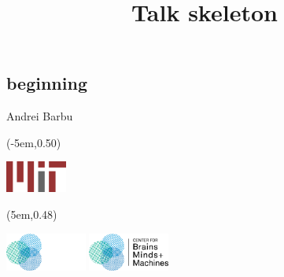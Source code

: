\newcommand{\darkmode}{}




\title[skeleton]{Talk skeleton}

\author[Andrei Barbu]{}

\institute[MIT]{}

\date[August, 2018]{}


\lsstyle

\subsection{beginning}
\begin{frame}[plain]
  \titlepage
  \begin{center}
    \vspace{3ex}
    Andrei Barbu
    \begin{textblock*}{\paperwidth}(-5em,0.50\textheight)
      \begin{footnotesize}
        \includegraphics[width=0.15\textwidth]{../images/logo-mit}
      \end{footnotesize}
    \end{textblock*}
    \begin{textblock*}{\paperwidth}(5em,0.48\textheight)
      \begin{footnotesize}
        \ifdefined\darkmode
        \includegraphics[width=0.2\textwidth]{../images/cbmm-logo-inverted}
        \else
        \includegraphics[width=0.2\textwidth]{../images/cbmm-logo}
        \fi
      \end{footnotesize}
    \end{textblock*}
  \end{center}
\end{frame}

\begin{frame}[plain]
  \centering
\end{frame}


